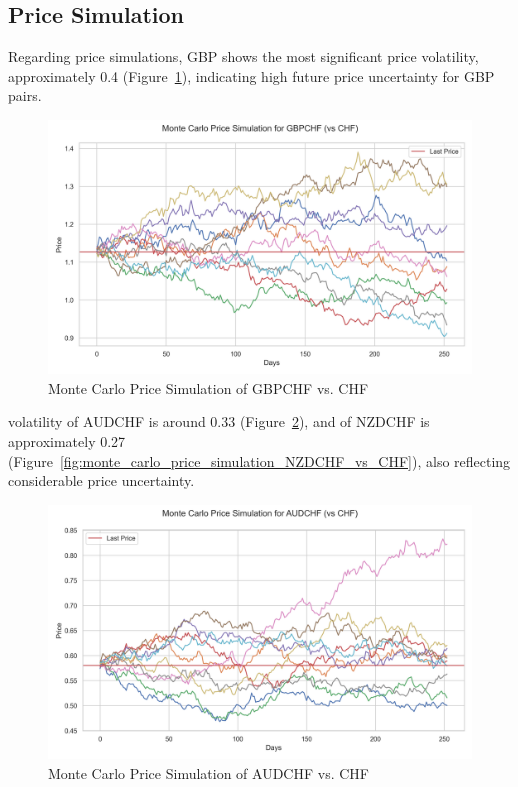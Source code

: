 \documentclass[a4paper, 12pt]{article}
\begin{document}
\subsection{Price Simulation}
Regarding price simulations, GBP shows the most significant price volatility, approximately 0.4 (Figure~\ref{fig:monte_carlo_price_simulation_GBPCHF_vs_CHF}), indicating high future price uncertainty for GBP pairs. 

\begin{figure}[h]
    \centering  \includegraphics[width=0.75\linewidth]{reports/figures/monte_carlo_price_simulation_GBPCHF_vs_CHF.png}
    \caption{Monte Carlo Price Simulation of GBPCHF vs. CHF}  \label{fig:monte_carlo_price_simulation_GBPCHF_vs_CHF}
\end{figure}

volatility of AUDCHF is around 0.33 (Figure~\ref{fig:monte_carlo_price_simulation_AUDCHF_vs_CHF}), and of NZDCHF is approximately 0.27 (Figure~\ref{fig:monte_carlo_price_simulation_NZDCHF_vs_CHF}), also reflecting considerable price uncertainty. 

\begin{figure}[h]
    \centering
    \includegraphics[width=0.75\linewidth]{reports/figures/monte_carlo_price_simulation_AUDCHF_vs_CHF.png}
    \caption{Monte Carlo Price Simulation of AUDCHF vs. CHF} \label{fig:monte_carlo_price_simulation_AUDCHF_vs_CHF}
\end{figure}
\end{document}
